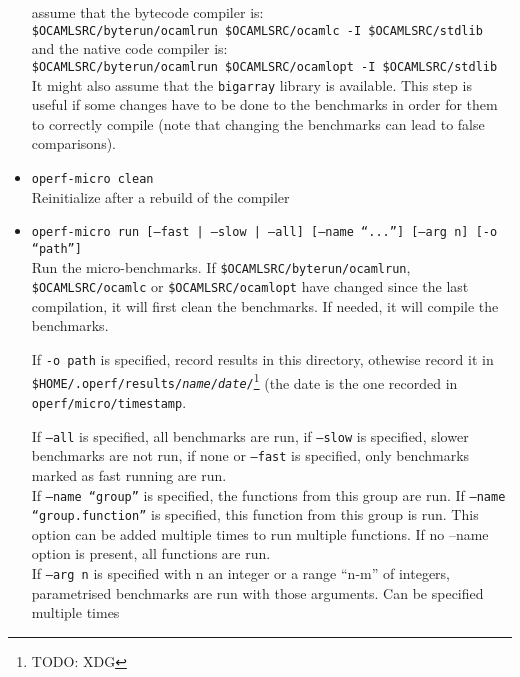 \documentclass[11pt,a4paper]{article}
\begin{document}
\begin{itemize}
  assume that the bytecode compiler is:\\
  {\tt \$OCAMLSRC/byterun/ocamlrun \$OCAMLSRC/ocamlc -I \$OCAMLSRC/stdlib}\\
  and the native code compiler is:\\
  {\tt \$OCAMLSRC/byterun/ocamlrun \$OCAMLSRC/ocamlopt -I \$OCAMLSRC/stdlib}\\
  It might also assume that the {\tt bigarray} library is available.
  This step is useful if some changes have to be done to the benchmarks in
  order for them to correctly compile (note that changing the benchmarks
  can lead to false comparisons).
\item {\tt operf-micro clean}\\
  Reinitialize after a rebuild of the compiler
\item {\tt operf-micro run [--fast | --slow | --all] [--name ``...'']
  [--arg n] [-o ``path'']}\\
  Run the micro-benchmarks. If {\tt \$OCAMLSRC/byterun/ocamlrun},
  {\tt \$OCAMLSRC/ocamlc} or {\tt \$OCAMLSRC/ocamlopt} have changed since the
  last compilation, it will first clean the benchmarks. If needed, it will
  compile the benchmarks.

  If {\tt -o path} is specified, record results in this directory,
  othewise record it in {\tt
    \$HOME/.operf/results/{\em name}/{\em date}/}\footnote{TODO: XDG}
  (the date is the one recorded in {\tt operf/micro/timestamp}.

  If {\tt --all} is specified, all benchmarks are run, if {\tt --slow}
  is specified, slower benchmarks are not run, if none or
  {\tt --fast} is specified, only benchmarks marked as fast
  running are run. \\
  If {\tt --name ``group''} is specified, the functions from this
  group are run. If {\tt --name ``group.function''} is specified, this
  function from this group is run. This option can be added multiple
  times to run multiple functions. If no --name option is present, all
  functions are run. \\
  If {\tt --arg n} is specified with n an integer or a range ``n-m'' of
  integers, parametrised benchmarks are run with those arguments. Can
  be specified multiple times


\end{itemize}
\end{document}
